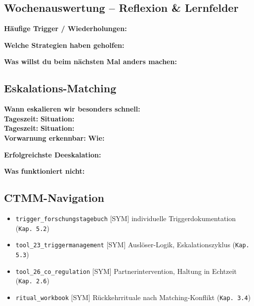 \subsection*{\textcolor{ctmmGreen}{Wochenauswertung -- Reflexion \& Lernfelder}}

\begin{tcolorbox}[colback=ctmmGreen!5!white,colframe=ctmmGreen,title=Welche Muster wiederholen sich? Was willst du nächste Woche ausprobieren?]

\textbf{Häufige Trigger / Wiederholungen:}\\

\textbf{Welche Strategien haben geholfen:}\\

\textbf{Was willst du beim nächsten Mal anders machen:}\\

\end{tcolorbox}

\subsection*{\textcolor{ctmmRed}{Eskalations-Matching}}

\textbf{Wann eskalieren wir besonders schnell:}\\
\textbf{Tageszeit:}  \quad \textbf{Situation:} \\
\textbf{Tageszeit:}  \quad \textbf{Situation:} \\
\textbf{Vorwarnung erkennbar:}  \quad \textbf{Wie:} 

\textbf{Erfolgreichste Deeskalation:}\\

\textbf{Was funktioniert nicht:}\\

\subsection*{\textcolor{ctmmBlue}{CTMM-Navigation}}

\begin{itemize}
  \item \texttt{trigger\_forschungstagebuch} [SYM] individuelle Triggerdokumentation (\texttt{Kap. 5.2})
  \item \texttt{tool\_23\_triggermanagement} [SYM] Auslöser-Logik, Eskalationszyklus (\texttt{Kap. 5.3})
  \item \texttt{tool\_26\_co\_regulation} [SYM] Partnerintervention, Haltung in Echtzeit (\texttt{Kap. 2.6})
  \item \texttt{ritual\_workbook} [SYM] Rückkehrrituale nach Matching-Konflikt (\texttt{Kap. 3.4})
\end{itemize}

